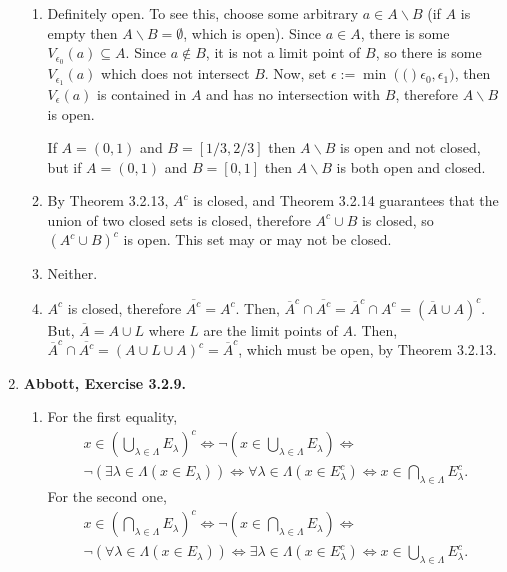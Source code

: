 \documentclass{article}
\newcommand{\exc}[2][Abbott]{\item \textbf{#1, Exercise #2.}}
\let\oldmin\min
\renewcommand{\min}[1]{\oldmin \left( #1 \right)}
\begin{document}
\begin{enumerate}
\begin{enumerate}
        \item Definitely open. To see this, choose some arbitrary $a \in A \backslash B$ (if $A$ is empty then $A \backslash B = \emptyset$, which is open). Since $a \in A$, there is some $V_{\epsilon_0}(a) \subseteq A$. Since $a \notin B$, it is not a limit point of $B$, so there is some $V_{\epsilon_1}(a)$ which does not intersect $B$. Now, set $\epsilon := \min (\epsilon_0, \epsilon_1)$, then $V_\epsilon(a)$ is contained in $A$ and has no intersection with $B$, therefore $A\backslash B$ is open.
        
        If $A = (0,1)$ and $B = [1/3, 2/3]$ then $A \backslash B$ is open and not closed, but if $A = (0,1)$ and $B = [0, 1]$ then $A\backslash B$ is both open and closed.
        
        \item By Theorem 3.2.13, $A^c$ is closed, and Theorem 3.2.14 guarantees that the union of two closed sets is closed, therefore $A^c \cup B$ is closed, so $(A^c \cup B)^c$ is open. This set may or may not be closed.
        
        \item Neither.
        
        \item $A^c$ is closed, therefore $\overline{A^c} = A^c$. Then, $\overline{A}^c \cap \overline{A^c} = \overline{A}^c \cap A^c = (\overline{A} \cup A)^c$. But, $\overline{A} = A \cup L$ where $L$ are the limit points of $A$. Then, 
        $\overline{A}^c \cap \overline{A^c} = (A \cup L \cup A)^c = \overline{A}^c$, which must be open, by Theorem 3.2.13.
    \end{enumerate}
    
    \exc{3.2.9}
    \begin{enumerate}
        \item For the first equality, 
        \begin{gather*}
            x \in \left (\bigcup_{\lambda \in \Lambda} E_\lambda \right)^c \iff
             \neg(x \in \bigcup_{\lambda \in \Lambda} E_\lambda) \iff \\
             \neg(\exists \lambda \in \Lambda (x \in E_\lambda)) \iff \forall \lambda \in \Lambda (x \in E_\lambda^c) \iff x \in \bigcap_{\lambda \in \Lambda} E_\lambda^c.
        \end{gather*} For the second one,
        \begin{gather*}
            x \in \left( \bigcap_{\lambda \in \Lambda} E_\lambda \right)^c \iff 
            \neg (x \in \bigcap_{\lambda \in \Lambda} E_\lambda) \iff \\
            \neg(\forall \lambda \in \Lambda (x \in E_\lambda)) \iff 
            \exists \lambda \in \Lambda (x \in E_\lambda^c) \iff 
            x \in \bigcup_{\lambda \in \Lambda} E_\lambda^c.
        \end{gather*}
        

\end{enumerate}
\end{enumerate}
\end{document}
